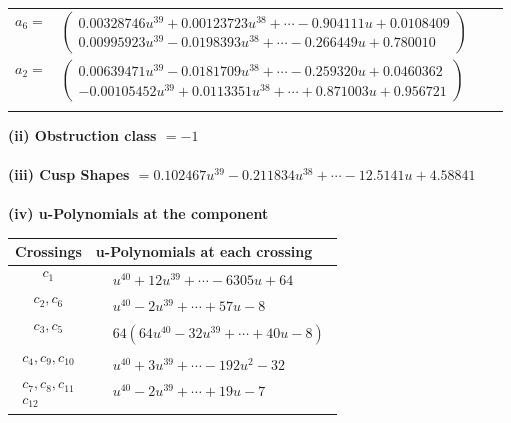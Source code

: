 \documentclass[1p]{elsarticle_modified}
\theoremstyle{definition}
\begin{document}
\begin{tabular}{m{7pt} m{180pt} m{7pt} m{180pt} }
\flushright $a_{6}=$&$\begin{pmatrix}0.00328746 u^{39}+0.00123723 u^{38}+\cdots-0.904111 u+0.0108409\\0.00995923 u^{39}-0.0198393 u^{38}+\cdots-0.266449 u+0.780010\end{pmatrix}$ \\
\flushright $a_{2}=$&$\begin{pmatrix}0.00639471 u^{39}-0.0181709 u^{38}+\cdots-0.259320 u+0.0460362\\-0.00105452 u^{39}+0.0113351 u^{38}+\cdots+0.871003 u+0.956721\end{pmatrix}$\\&\end{tabular}
\flushleft \textbf{(ii) Obstruction class $= -1$}\\~\\
\flushleft \textbf{(iii) Cusp Shapes $= 0.102467 u^{39}-0.211834 u^{38}+\cdots-12.5141 u+4.58841$}\\~\\
\newpage\renewcommand{\arraystretch}{1}
\flushleft \textbf{(iv) u-Polynomials at the component}\newline \\
\begin{tabular}{m{50pt}|m{274pt}}
Crossings & \hspace{64pt}u-Polynomials at each crossing \\
\hline $$\begin{aligned}c_{1}\end{aligned}$$&$\begin{aligned}
&u^{40}+12 u^{39}+\cdots-6305 u+64
\end{aligned}$\\
\hline $$\begin{aligned}c_{2},c_{6}\end{aligned}$$&$\begin{aligned}
&u^{40}-2 u^{39}+\cdots+57 u-8
\end{aligned}$\\
\hline $$\begin{aligned}c_{3},c_{5}\end{aligned}$$&$\begin{aligned}
&64(64 u^{40}-32 u^{39}+\cdots+40 u-8)
\end{aligned}$\\
\hline $$\begin{aligned}c_{4},c_{9},c_{10}\end{aligned}$$&$\begin{aligned}
&u^{40}+3 u^{39}+\cdots-192 u^2-32
\end{aligned}$\\
\hline $$\begin{aligned}c_{7},c_{8},c_{11}\\c_{12}\end{aligned}$$&$\begin{aligned}
&u^{40}-2 u^{39}+\cdots+19 u-7
\end{aligned}$\\
\hline
\end{tabular}\\~\\
\end{document}
